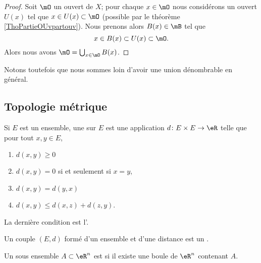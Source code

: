 \begin{proof}
    Soit \( \mO\) un ouvert de \( X\); pour chaque \( x\in\mO\) nous considérons un ouvert \( U(x)\) tel que \( x\in U(x)\subset \mO\) (possible par le théorème \ref{ThoPartieOUvpartouv}). Nous prenons alors \( B(x)\in\mB\) tel que 
    \begin{equation}
        x\in B(x)\subset U(x)\subset \mO.
    \end{equation}
    Alors nous avons \( \mO=\bigcup_{x\in \mO}B(x)\).
\end{proof}
Notons toutefois que nous sommes loin d'avoir une union dénombrable en général.

\subsection{Topologie métrique}

\begin{definition}  \label{DefMVNVFsX}
    Si $E$ est un ensemble, une  sur $E$ est une application $d\colon E\times E\to \eR$ telle que pour tout $x,y\in E$,
    \begin{enumerate}

    \item
    $d(x,y)\geq 0$

    \item
    $d(x,y)=0$ si et seulement si $x=y$,

    \item
    $d(x,y)=d(y,x)$

    \item
    $d(x,y)\leq d(x,z)+d(z,y)$.

    \end{enumerate}
    La dernière condition est l'. 

    Un couple $(E,d)$ formé d'un ensemble et d'une distance est un .
\end{definition}


\begin{definition}
  Un sous ensemble $A \subset \eR^n$ est  si il existe une boule de $\eR^n$ contenant $A$.
\end{definition}

